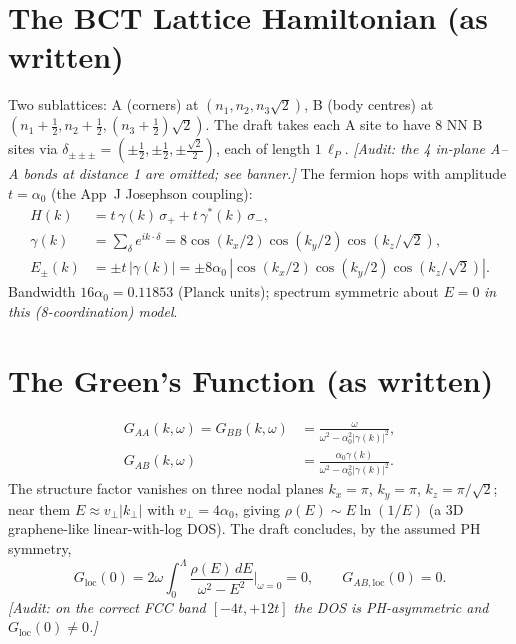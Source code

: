 \documentclass[aps,prl,preprint,superscriptaddress,floatfix]{revtex4-2}
\newcommand{\az}{\alpha_0}
\newcommand{\Gloc}{G_{\mathrm{loc}}}
\begin{document}
\section{The BCT Lattice Hamiltonian (as written)}
Two sublattices: A (corners) at $(n_1,n_2,n_3\sqrt2)$, B (body centres) at
$(n_1+\tfrac12,n_2+\tfrac12,(n_3+\tfrac12)\sqrt2)$. The draft takes each A site to have 8 NN B
sites via $\delta_{\pm\pm\pm}=(\pm\tfrac12,\pm\tfrac12,\pm\tfrac{\sqrt2}{2})$, each of length
$1\,\ell_P$. \emph{[Audit: the 4 in-plane A--A bonds at distance 1 are omitted; see banner.]}
The fermion hops with amplitude $t=\az$ (the App~J Josephson coupling):
\begin{align}
  H(k) &= t\,\gamma(k)\,\sigma_+ + t\,\gamma^*(k)\,\sigma_-,\\
  \gamma(k) &= \textstyle\sum_\delta e^{ik\cdot\delta}
    = 8\cos(k_x/2)\cos(k_y/2)\cos(k_z/\sqrt2),\\
  E_\pm(k) &= \pm t\,|\gamma(k)| = \pm 8\az\,|\cos(k_x/2)\cos(k_y/2)\cos(k_z/\sqrt2)|.
\end{align}
Bandwidth $16\az=0.11853$ (Planck units); spectrum symmetric about $E=0$ \emph{in this
(8-coordination) model}.

\section{The Green's Function (as written)}
\begin{align}
  G_{AA}(k,\omega)=G_{BB}(k,\omega) &= \frac{\omega}{\omega^2-\az^2|\gamma(k)|^2},\\
  G_{AB}(k,\omega) &= \frac{\az\gamma(k)}{\omega^2-\az^2|\gamma(k)|^2}.
\end{align}
The structure factor vanishes on three nodal planes $k_x=\pi$, $k_y=\pi$, $k_z=\pi/\sqrt2$; near
them $E\approx v_\perp|k_\perp|$ with $v_\perp=4\az$, giving $\rho(E)\sim E\ln(1/E)$ (a 3D
graphene-like linear-with-log DOS). The draft concludes, by the assumed PH symmetry,
\begin{equation}
  \Gloc(0)=2\omega\!\int_0^\Lambda\!\frac{\rho(E)\,dE}{\omega^2-E^2}\Big|_{\omega=0}=0,\qquad
  G_{AB,\mathrm{loc}}(0)=0.
\end{equation}
\emph{[Audit: on the correct FCC band $[-4t,+12t]$ the DOS is PH-asymmetric and $\Gloc(0)\neq0$.]}
\end{document}
